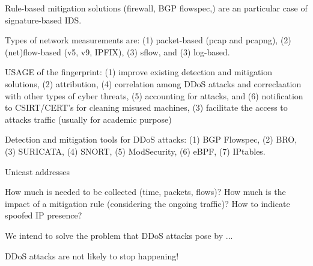 Rule-based mitigation solutions (\eg firewall, BGP flowspec,) are an particular case of signature-based IDS.

Types of network measurements are: (1) packet-based (\ie pcap and pcapng), (2) (net)flow-based (\eg v5, v9, IPFIX), (3) sflow, and (3) log-based. 

USAGE of the fingerprint: (1) improve existing detection and mitigation solutions, (2) attribution, (4) correlation among DDoS attacks and correclaation with other types of cyber threats, (5) accounting for attacks, and (6) notification to CSIRT/CERT's for cleaning misused machines, (3) facilitate the access to attacks traffic (usually for academic purpose)

Detection and mitigation tools for DDoS attacks: (1) BGP Flowspec, (2) BRO, (3) SURICATA, (4) SNORT, (5) ModSecurity, (6) eBPF, (7) IPtables.

Unicast addresses

How much is needed to be collected (time, packets, flows)? 
How much is the impact of a mitigation rule (considering the ongoing traffic)?
How to indicate spoofed IP presence?


We intend to solve the problem that DDoS attacks pose by ...

DDoS attacks are not likely to stop happening!



